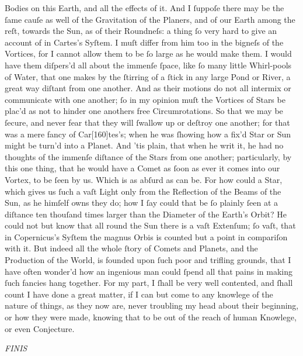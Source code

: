 \documentclass[letterpaper]{book}
\begin{document}
Bodies on this Earth, and all the effects of it. And I ſuppoſe there may be
the ſame cauſe as well of the Gravitation of the Planers, and of our Earth
among the reſt, towards the Sun, as of their Roundneſs: a thing ſo very
hard to give an account of in Cartes's Syſtem.
I muſt differ from him too in the bigneſs of the Vortices, for I cannot allow
them to be ſo large as he would make them. I would have them diſpers'd
all about the immenſe ſpace, like ſo many little Whirl-pools of Water, that
one makes by the ſtirring of a ſtick in any large Pond or River, a great
way diſtant from one another. And as their motions do not all intermix or
communicate with one another; ſo in my opinion muſt the Vortices of Stars
be plac'd as not to hinder one anothers free Circumrotations.
So that we may be ſecure, and never fear that they will ſwallow up or
deſtroy one another; for that was a mere fancy of Car[160]tes's; when he
was ſhowing how a fix'd Star or Sun might be turn'd into a Planet. And 'tis
plain, that when he writ it, he had no thoughts of the immenſe diſtance of
the Stars from one another; particularly, by this one thing, that he would
have a Comet as ſoon as ever it comes into our Vortex, to be ſeen by us.
Which is as abſurd as can be. For how could a Star, which gives us ſuch a
vaſt Light only from the Reflection of the Beams of the Sun, as he himſelf
owns they do; how I ſay could that be ſo plainly ſeen at a diſtance ten
thouſand times larger than the Diameter of the Earth's Orbit? He could
not but know that all round the Sun there is a vaſt Extenſum; ſo vaſt,
that in Copernicus's Syſtem the magnus Orbis is counted but a point in
compariſon with it. But indeed all the whole ſtory of Comets and Planets,
and the Production of the World, is founded upon ſuch poor and trifling
grounds, that I have often wonder'd how an ingenious man could ſpend all
that pains in making ſuch fancies hang together. For my part, I ſhall be
very well contented, and ſhall count I have done a great matter, if I can
but come to any knowlege of the nature of things, as they now are, never
troubling my head about their beginning, or how they were made, knowing
that to be out of the reach of human Knowlege, or even Conjecture.

\em{FINIS}
\end{document}
